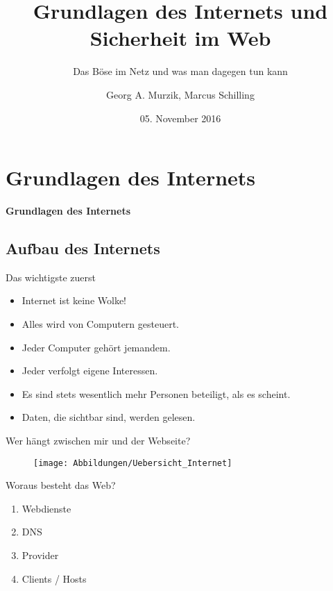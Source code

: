 \documentclass[utf8]{beamer}
\title{Grundlagen des Internets und Sicherheit im Web}
\subtitle{Das Böse im Netz und was man dagegen tun kann} %
\author{Georg A. Murzik, Marcus Schilling}
\institute{Terminal.21}
\date{05. November 2016}
\begin{document}
	
	\begin{frame}
		\titlepage
	\end{frame}
	
	\section{Grundlagen des Internets}
	\begin{frame}
		\centering \huge \textbf{Grundlagen des Internets}
	\end{frame}
	
	\subsection{Aufbau des Internets}
	\begin{frame}{Das wichtigste zuerst}
		\begin{itemize}
			\item Internet ist keine Wolke!
			\item Alles wird von Computern gesteuert.
			\item Jeder Computer gehört jemandem.
			\item Jeder verfolgt eigene Interessen.
			\item Es sind stets wesentlich mehr Personen beteiligt, als es scheint.				\item Daten, die sichtbar sind, werden gelesen.	
		\end{itemize}		
	\end{frame}
	
	\begin{frame}{Wer hängt zwischen mir und der Webseite?}
		\begin{figure}[H]
			\texttt{[image: Abbildungen/Uebersicht\_Internet]}
			\label{fig:Übersicht des Internets}
		\end{figure}
	\end{frame}	
	
	\begin{frame}{Woraus besteht das Web?}
		\begin{enumerate}
			\item Webdienste
			\item DNS
			\item Provider
			\item Clients / Hosts
		\end{enumerate}
	\end{frame}
		
\end{document}
